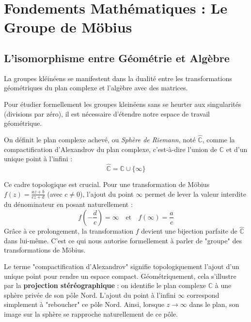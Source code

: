 
\newpage
\section{Fondements Mathématiques : Le Groupe de Möbius}
\label{sec:theorie_mobius}

\subsection{L'isomorphisme entre Géométrie et Algèbre}

La groupes kléinéens se manifestent dans la dualité entre les transformations géométriques du plan complexe et l'algèbre avec des matrices.

Pour étudier formellement les groupes kleinéens sans se heurter aux singularités (divisions par zéro), il est nécessaire d'étendre notre espace de travail géométrique.

\begin{definition}
On définit le plan complexe achevé, ou \textit{Sphère de Riemann}, noté $\hat{\mathbb{C}}$, comme la compactification d'Alexandrov du plan complexe, c'est-à-dire l'union de $\mathbb{C}$ et d'un unique point à l'infini :
\[ \hat{\mathbb{C}} = \mathbb{C} \cup \{\infty\} \]
\end{definition}

\begin{remark}
Ce cadre topologique est crucial. Pour une transformation de Möbius $f(z) = \frac{az+b}{cz+d}$ (avec $c \neq 0$), l'ajout du point $\infty$ permet de lever la valeur interdite du dénominateur en posant naturellement :
\[ f\left(-\frac{d}{c}\right) = \infty \quad \text{et} \quad f(\infty) = \frac{a}{c} \]
Grâce à ce prolongement, la transformation $f$ devient une bijection parfaite de $\hat{\mathbb{C}}$ dans lui-même. C'est ce qui nous autorise formellement à parler de "groupe" des transformations de Möbius.
\end{remark}\begin{remark}
Le terme "compactification d'Alexandrov" signifie topologiquement l'ajout d'un unique point pour rendre un espace compact. Géométriquement, cela s'illustre par la \textbf{projection stéréographique} : on identifie le plan complexe $\mathbb{C}$ à une sphère privée de son pôle Nord. L'ajout du point à l'infini $\infty$ correspond simplement à "reboucher" ce pôle Nord. Ainsi, lorsque $z \to \infty$ dans le plan, son image sur la sphère se rapproche naturellement de ce pôle.
\end{remark}

